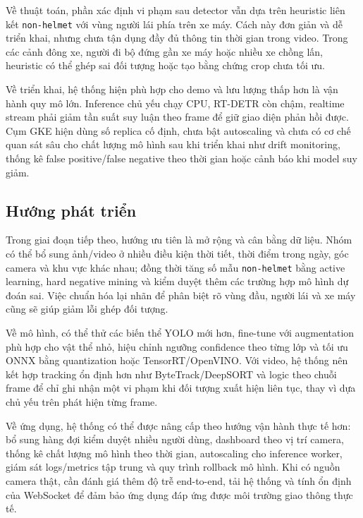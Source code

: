 Về thuật toán, phần xác định vi phạm sau detector vẫn dựa trên heuristic liên kết \texttt{non-helmet} với vùng người lái phía trên xe máy. Cách này đơn giản và dễ triển khai, nhưng chưa tận dụng đầy đủ thông tin thời gian trong video. Trong các cảnh đông xe, người đi bộ đứng gần xe máy hoặc nhiều xe chồng lấn, heuristic có thể ghép sai đối tượng hoặc tạo bằng chứng crop chưa tối ưu.

Về triển khai, hệ thống hiện phù hợp cho demo và lưu lượng thấp hơn là vận hành quy mô lớn. Inference chủ yếu chạy CPU, RT-DETR còn chậm, realtime stream phải giảm tần suất suy luận theo frame để giữ giao diện phản hồi được. Cụm GKE hiện dùng số replica cố định, chưa bật autoscaling và chưa có cơ chế quan sát sâu cho chất lượng mô hình sau khi triển khai như drift monitoring, thống kê false positive/false negative theo thời gian hoặc cảnh báo khi model suy giảm.

\subsection{Hướng phát triển}

Trong giai đoạn tiếp theo, hướng ưu tiên là mở rộng và cân bằng dữ liệu. Nhóm có thể bổ sung ảnh/video ở nhiều điều kiện thời tiết, thời điểm trong ngày, góc camera và khu vực khác nhau; đồng thời tăng số mẫu \texttt{non-helmet} bằng active learning, hard negative mining và kiểm duyệt thêm các trường hợp mô hình dự đoán sai. Việc chuẩn hóa lại nhãn để phân biệt rõ vùng đầu, người lái và xe máy cũng sẽ giúp giảm lỗi ghép đối tượng.

Về mô hình, có thể thử các biến thể YOLO mới hơn, fine-tune với augmentation phù hợp cho vật thể nhỏ, hiệu chỉnh ngưỡng confidence theo từng lớp và tối ưu ONNX bằng quantization hoặc TensorRT/OpenVINO. Với video, hệ thống nên kết hợp tracking ổn định hơn như ByteTrack/DeepSORT và logic theo chuỗi frame để chỉ ghi nhận một vi phạm khi đối tượng xuất hiện liên tục, thay vì dựa chủ yếu trên phát hiện từng frame.

Về ứng dụng, hệ thống có thể được nâng cấp theo hướng vận hành thực tế hơn: bổ sung hàng đợi kiểm duyệt nhiều người dùng, dashboard theo vị trí camera, thống kê chất lượng mô hình theo thời gian, autoscaling cho inference worker, giám sát logs/metrics tập trung và quy trình rollback mô hình. Khi có nguồn camera thật, cần đánh giá thêm độ trễ end-to-end, tải hệ thống và tính ổn định của WebSocket để đảm bảo ứng dụng đáp ứng được môi trường giao thông thực tế.
